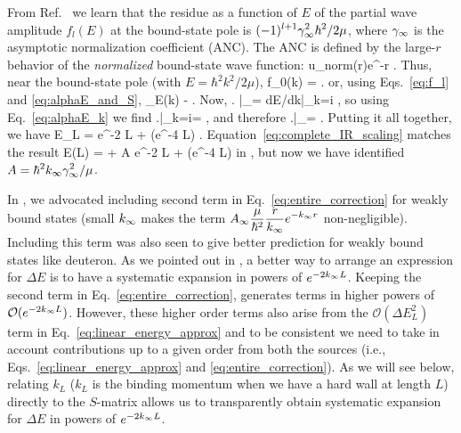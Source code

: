 	From Ref.~\cite{taylor2006scattering} we learn that the residue as a
	function of $E$ of the partial wave amplitude $f_l(E)$ at the
	bound-state pole is $\displaystyle (-1)^{l+1} \gamma_\infty^2 \hbar^2/2 \mu$,
	where $\gamma_\infty$ is	the asymptotic normalization coefficient (ANC).  The ANC is
	defined by the large-$r$ behavior of the
	\emph{normalized} bound-state wave function:
	\beq
	  u_{\rm norm}(r)\longrightarrow \ANC e^{-\kinf r}
	  \;.
	  \label{eq:definition_of_ANC}
	\eeq
	Thus, near the bound-state pole (with $E = \hbar^2 k^2/2\mu$),
	\beq
	  f_0(k)  \approx  {}
	      =   \;.
	\eeq
	or, using Eqs.~\eqref{eq:f_l} and \eqref{eq:alphaE_and_S},
	\beq
	  \alpha_E(k) \approx -
	  \;.
	  \label{eq:alphaE_k}
	\eeq
	Now,
	\beq
	  \left.
	  \right|_{\Einf}=
	  {dE/dk|_{k=i\kinf}}
	  \;,
	\eeq
	so using Eq.~\eqref{eq:alphaE_k} we find
	\beq
	  \left.\right|_{k=i\kinf}=
	  \;,
	\eeq
	and therefore
	\beq
	  \left.\right|_{\Einf}=
	  \;.
	\eeq
	Putting it all together, we have
	\beq
	  \Delta E_L =  e^{-2 \kinf L}
	    + (e^{-4 \kinf L})
	    \;.
	    \label{eq:complete_IR_scaling}
	\eeq
	Equation~\eqref{eq:complete_IR_scaling} matches the result
	\beq
	E(L) = \Einf + A e^{-2 \kinf L} + (e^{-4 \kinf L})
	\label{eq:exp_L_extrapolation}
	\eeq
	in \cite{Furnstahl2012}, but now we have identified
	$\displaystyle A = \hbar^2k_{\infty}\gamma_\infty^2/\mu$.

	In \cite{More:2013rma}, we advocated including second term in
	Eq.~\eqref{eq:entire_correction} for weakly bound states (small $k_{\infty}$
	makes the term $\displaystyle A_{\infty} \frac{\mu}{\hbar^2}\frac{r}{k_{\infty}}
	e^{-k_{\infty} r}$
	non-negligible).  Including this term was also seen to give better prediction
	for weakly bound states like deuteron.  As we pointed out in
	\cite{Furnstahl:2013vda}, a better way to arrange an expression for
	$\Delta E$ is to have a systematic expansion in powers of $e^{-2 k_{\infty} L}$.
 	Keeping the second term in Eq.~\eqref{eq:entire_correction}, generates terms
	in higher powers of $\mathcal{O}(e^{-2 k_{\infty} L})$.  However, these higher
	order terms also arise from the $\mathcal{O}(\Delta E_L ^2)$ term in
	Eq.~\eqref{eq:linear_energy_approx} and to be consistent
	we need to take in account contributions up to a given order from both the
	sources (i.e., Eqs.~\eqref{eq:linear_energy_approx} and
	\eqref{eq:entire_correction}).  As we will see below, relating $k_L$
	($k_L$ is the binding momentum when we have a hard wall at length $L$)
	directly to the $S$-matrix allows us to transparently obtain systematic
	expansion for $\Delta E$ in powers of $e^{-2 k_{\infty} L}$.

